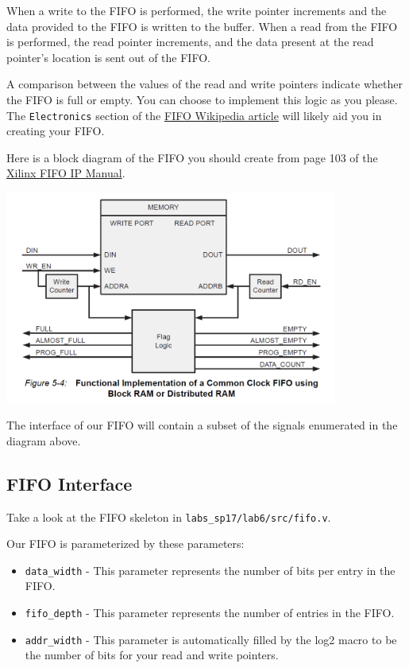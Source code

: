 \documentclass[11pt]{article}
\begin{document}
When a write to the FIFO is performed, the write pointer increments and the data provided to the FIFO is written to the buffer. When a read from the FIFO is performed, the read pointer increments, and the data present at the read pointer's location is sent out of the FIFO.

A comparison between the values of the read and write pointers indicate whether the FIFO is full or empty. You can choose to implement this logic as you please. The \verb|Electronics| section of the \href{https://en.wikipedia.org/wiki/FIFO_(computing_and_electronics)}{FIFO Wikipedia article} will likely aid you in creating your FIFO.

Here is a block diagram of the FIFO you should create from page 103 of the \href{https://www.xilinx.com/support/documentation/ip_documentation/fifo_generator_ug175.pdf}{Xilinx FIFO IP Manual}.

\begin{center}
	\includegraphics[height=7cm]{sync_fifo_diagram.png}
\end{center}

The interface of our FIFO will contain a subset of the signals enumerated in the diagram above.

\subsection{FIFO Interface}
Take a look at the FIFO skeleton in \verb|labs_sp17/lab6/src/fifo.v|.

Our FIFO is parameterized by these parameters:
\begin{itemize}
	\item \verb|data_width| - This parameter represents the number of bits per entry in the FIFO.
	\item \verb|fifo_depth| - This parameter represents the number of entries in the FIFO.
	\item \verb|addr_width| - This parameter is automatically filled by the log2 macro to be the number of bits for your read and write pointers.
\end{itemize}
\end{document}
